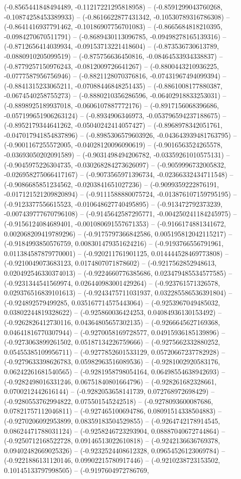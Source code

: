 (-0.8565441848494489, -0.11217221295818958) -- (-0.8591299043760268, -0.10874258453389933) -- (-0.8616622877431342, -0.10530789316786308) -- (-0.8641416937791462, -0.10186907756701083) -- (-0.8665684818210395, -0.0984270670511791) -- (-0.8689430113096785, -0.09498278165139316) -- (-0.8712656414039934, -0.09153713221418604) -- (-0.873536730613789, -0.0880910205099519) -- (-0.875756636450816, -0.08464533934338837) -- (-0.8779257150976243, -0.0812009726641267) -- (-0.8800443210936225, -0.0777587956756946) -- (-0.8821128070376816, -0.07431967494099394) -- (-0.8841315233065211, -0.07088446848251435) -- (-0.8861008177880387, -0.0674540258755273) -- (-0.8880210356286596, -0.06402918833253031) -- (-0.8898925189937018, -0.0606107887772176) -- (-0.8917156068396686, -0.057199651906263124) -- (-0.8934906346973, -0.053796594237188675) -- (-0.8952179344641262, -0.05040242414057427) -- (-0.8968978342051761, -0.047017941854837896) -- (-0.8985306579603926, -0.043643939481763795) -- (-0.9001167255572005, -0.04028120096090619) -- (-0.9016563524265578, -0.03693050202091589) -- (-0.9031498494206782, -0.03359261010575131) -- (-0.9045975226304735, -0.030268284273626097) -- (-0.9059996732005832, -0.026958275066417167) -- (-0.9073565971396734, -0.02366332434711548) -- (-0.9086685851234562, -0.0203841651027236) -- (-0.9099359222876191, -0.017121521209820894) -- (-0.9111588880075724, -0.013876107159795195) -- (-0.9123377556615523, -0.010648627740495895) -- (-0.913472792373239, -0.007439777670796108) -- (-0.9145642587295771, -0.004250241184245975) -- (-0.9156124084689401, -0.001080691557671353) -- (-0.9166174881341672, 0.002068209419789296) -- (-0.9175797366842586, 0.005195812042115217) -- (-0.9184993850576759, 0.008301479351624216) -- (-0.9193766556791961, 0.011384587879770001) -- (-0.920211761901125, 0.014444528469773808) -- (-0.9210049073683123, 0.0174807071878602) -- (-0.9217562852948613, 0.020492546330374013) -- (-0.9224660776385686, 0.023479485534577585) -- (-0.9231344541569974, 0.026440983001429264) -- (-0.923761571326578, 0.029376516839101613) -- (-0.9243475711031937, 0.032285586536391804) -- (-0.924892579499285, 0.035167714575443064) -- (-0.9253967049485032, 0.03802244819328622) -- (-0.925860036424253, 0.04084936130153492) -- (-0.9262826412730116, 0.04364805657302135) -- (-0.9266645627169368, 0.04641816770307944) -- (-0.9270058169728577, 0.04915936185139896) -- (-0.9273063899261502, 0.05187134226759666) -- (-0.9275662332880252, 0.05455385109956711) -- (-0.9277852601533129, 0.05720667237782928) -- (-0.9279633398626783, 0.05982963516089536) -- (-0.9281002920583176, 0.06242261681540565) -- (-0.9281958798054164, 0.06498554638942693) -- (-0.9282498016331246, 0.06751840801664796) -- (-0.928261682328661, 0.0700212442616144) -- (-0.9282053658141739, 0.072768972698429) -- (-0.9280553762994822, 0.075501545242518) -- (-0.9278093600087686, 0.07821757112046811) -- (-0.927465100694786, 0.08091514338504883) -- (-0.9270206092953899, 0.08359183504529855) -- (-0.9264742178914545, 0.08624471788031124) -- (-0.9258246723293904, 0.08887040672744864) -- (-0.9250712168522728, 0.09146513022610818) -- (-0.9242136636769378, 0.09402482669025326) -- (-0.9232524408612328, 0.09654526123069784) -- (-0.9221886131120146, 0.09902215780917446) -- (-0.9210238723153502, 0.10145133797998505) -- (-0.9197604972786769, 